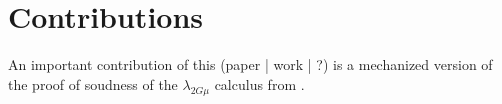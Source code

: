 \section{Contributions}


An important contribution of this (paper | work | ?) is a mechanized version of the proof of soudness of the $\lambda_{2G\mu}$ calculus from \cite{XiGRDT}.